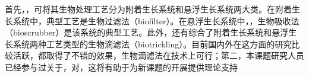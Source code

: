 首先，，可将其生物处理工艺分为附着生长系统和悬浮生长系统两大类。在附着生长系统中，典型工艺是生物过滤法（biofilter）。在悬浮生长系统中，，生物吸收法（bioscrubber）是该系统的典型工艺。此外，还有综合了附着生长系统和悬浮生长系统两种工艺类型的生物滴滤法（biotrickling）。目前国内外在这方面的研究比较活跃，都取得了不错的效果，生物滴滤法在技术上可行；第二，本课题研究人员已经参与过关于，对，这将有助于为新课题的开展提供理论支持
